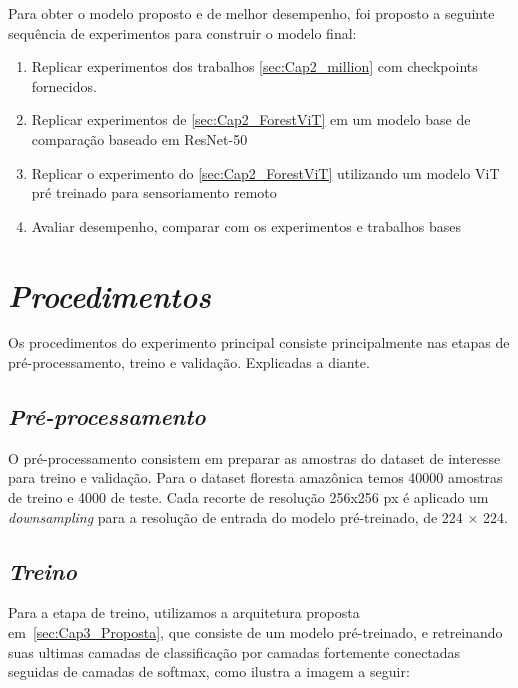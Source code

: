 Para obter o modelo proposto e de melhor desempenho, foi proposto a seguinte sequência de experimentos para construir o modelo final:

\begin{enumerate}
\item  Replicar experimentos dos trabalhos \ref{sec:Cap2_million} com checkpoints fornecidos. 
\item  Replicar experimentos de \ref{sec:Cap2_ForestViT} em um modelo base de comparação baseado em ResNet-50
\item  Replicar o experimento do \ref{sec:Cap2_ForestViT} utilizando um modelo ViT pré treinado para sensoriamento remoto
\item Avaliar desempenho, comparar com os experimentos e trabalhos bases
\end{enumerate}


    

\section{\textit{Procedimentos}}\label{sec:Cap3_Procedimentos}

Os procedimentos do experimento principal consiste principalmente nas etapas de 
pré-processamento, treino e validação. Explicadas a diante.

\subsection{\textit{Pré-processamento}}\label{sec:Cap3_PreProcess}
O pré-processamento consistem em preparar as amostras do dataset de interesse para treino e validação. Para o dataset floresta amazônica temos 40000 amostras de treino e 4000 de teste. Cada recorte de resolução 256x256 px é aplicado um \textit{downsampling} para a resolução de entrada do modelo pré-treinado, de 224 × 224. 

\subsection{\textit{Treino}}\label{sec:Cap3_Treino}
Para a etapa de treino, utilizamos a arquitetura proposta em~\ref{sec:Cap3_Proposta}, que consiste de um modelo pré-treinado, e retreinando suas ultimas camadas de classificação por camadas fortemente conectadas seguidas de camadas de softmax, como ilustra a imagem a seguir:


